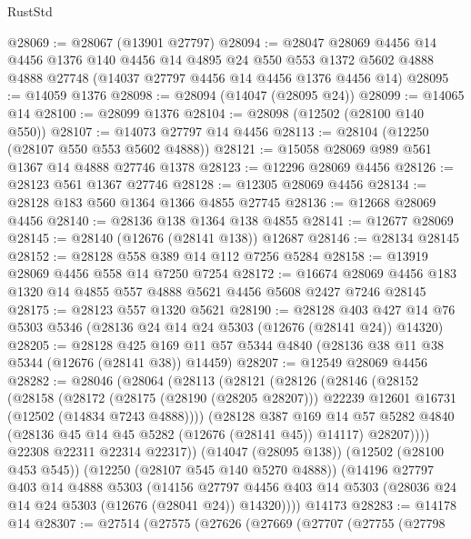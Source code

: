 \begin{lexlean}{RustStd}
\begin{coremodule}
@28069 := @28067 (@13901 @27797)
@28094 := @28047
    @28069
    @4456
    @14
    @4456
    @1376
    @140
    @4456
    @14
    @4895
    @24
    @550
    @553
    @1372
    @5602
    @4888
    @4888
    @27748
    (@14037 @27797 @4456 @14 @4456 @1376 @4456 @14)
@28095 := @14059 @1376
@28098 := @28094 (@14047 (@28095 @24))
@28099 := @14065 @14
@28100 := @28099 @1376
@28104 := @28098 (@12502 (@28100 @140 @550))
@28107 := @14073 @27797 @14 @4456
@28113 := @28104 (@12250 (@28107 @550 @553 @5602 @4888))
@28121 := @15058 @28069 @989 @561 @1367 @14 @4888 @27746 @1378
@28123 := @12296 @28069 @4456
@28126 := @28123 @561 @1367 @27746
@28128 := @12305 @28069 @4456
@28134 := @28128 @183 @560 @1364 @1366 @4855 @27745
@28136 := @12668 @28069 @4456
@28140 := @28136 @138 @1364 @138 @4855
@28141 := @12677 @28069
@28145 := @28140 (@12676 (@28141 @138)) @12687
@28146 := @28134 @28145
@28152 := @28128 @558 @389 @14 @112 @7256 @5284
@28158 := @13919 @28069 @4456 @558 @14 @7250 @7254
@28172 := @16674 @28069 @4456 @183 @1320 @14 @4855 @557 @4888 @5621 @4456 @5608 @2427 @7246 @28145
@28175 := @28123 @557 @1320 @5621
@28190 := @28128
    @403
    @427
    @14
    @76
    @5303
    @5346
    (@28136 @24 @14 @24 @5303 (@12676 (@28141 @24)) @14320)
@28205 := @28128
    @425
    @169
    @11
    @57
    @5344
    @4840
    (@28136 @38 @11 @38 @5344 (@12676 (@28141 @38)) @14459)
@28207 := @12549 @28069 @4456
@28282 := @28046
    (@28064
      (@28113
        (@28121
          (@28126
            (@28146
              (@28152
                (@28158
                  (@28172
                    (@28175 (@28190 (@28205 @28207)))
                    @22239
                    @12601
                    @16731
                    (@12502 (@14834 @7243 @4888))))
                (@28128
                  @387
                  @169
                  @14
                  @57
                  @5282
                  @4840
                  (@28136 @45 @14 @45 @5282 (@12676 (@28141 @45)) @14117)
                  @28207))))
          @22308
          @22311
          @22314
          @22317))
      (@14047 (@28095 @138))
      (@12502 (@28100 @453 @545))
      (@12250 (@28107 @545 @140 @5270 @4888))
      (@14196
        @27797
        @403
        @14
        @4888
        @5303
        (@14156
          @27797
          @4456
          @403
          @14
          @5303
          (@28036 @24 @14 @24 @5303 (@12676 (@28041 @24)) @14320))))
    @14173
@28283 := @14178 @14
@28307 := @27514
    (@27575
      (@27626
        (@27669
          (@27707
            (@27755
              (@27798

\end{coremodule}
\end{lexlean}
